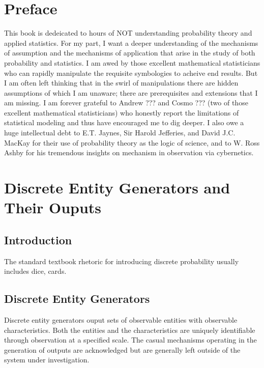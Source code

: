 \documentclass{book}
\begin{document}
\addtocounter{page}{2}

\chapter*{Preface}
This book is dedeicated to hours of NOT understanding probability theory and applied statistics. For my part, I want a deeper understanding of the mechanisms of assumption and the mechanisms of application that arise in the study of both probability and statistics. I am awed by those excellent mathematical statisticians who can rapidly manipulate the requisite symbologies to acheive end results. But I am often left thinking that in the swirl of manipulations there are hidden assumptions of which I am unaware; there are prerequisites and extensions that I am missing. I am forever grateful to Andrew ??? and Cosmo ??? (two of those excellent mathematical statisticians) who honestly report the limitations of statistical modeling and thus have encouraged me to dig deeper. I also owe a huge intellectual debt to E.T. Jaynes, Sir Harold Jefferies, and David J.C. MacKay for their use of probability theory as the logic of science, and to W. Ross Ashby for his tremendous insights on mechanism in observation via cybernetics.


\setcounter{tocdepth}{3}
\tableofcontents

\mainmatter



\chapter{Discrete Entity Generators and Their Ouputs}
\section{Introduction}
The standard textbook rhetoric for introducing discrete probability usually includes dice, cards.

\section{Discrete Entity Generators}
Discrete entity generators ouput sets of observable entities with observable characteristics. Both the entities and the characteristics are uniquely identifiable through observation at a specified scale. The casual mechanisms operating in the generation of outputs are acknowledged but are generally left outside of the system under investigation.  
\end{document}
